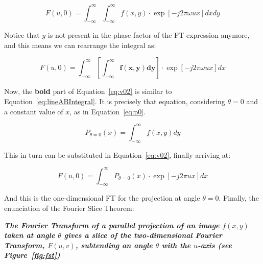 \begin{equation}
    \label{eq:v0}
    F(u, 0) = \int_{-\infty}^{\infty} \int_{-\infty}^{\infty} f(x, y)
    \cdot \exp \left[  -j 2\pi  \omega ux \right] dx dy
\end{equation}

Notice that $y$ is not present in the phase factor of the \gls{FT}
expression anymore, and this means we can rearrange the integral as:

\begin{equation}
    \label{eq:v02}
    F(u, 0) = \int_{-\infty}^{\infty} \left[ \mathbf{\int_{-\infty}^{\infty}
    f(x, y) dy }\right] \cdot \exp \left[  -j 2\pi  \omega ux \right] dx 
\end{equation}

Now, the \textbf{bold} part of Equation~\ref{eq:v02} is similar to
Equation~\ref{eq:lineABIntegral}. It is precisely that equation,
considering $\theta=0$ and a constant value of $x$, as in
Equation~\ref{eq:p0}.

\begin{equation}
    \label{eq:p0}
    P_{\theta=0} (x) = \int_{-\infty}^{\infty} f(x, y) dy
\end{equation}

This in turn can be substituted in Equation~\ref{eq:v02}, finally
arriving at:

\begin{equation}
    \label{eq:FTP}
    F(u, 0) = \int_{-\infty}^{\infty} P_{\theta=0} (x) \cdot \exp \left[
    -j 2\pi ux \right] dx
\end{equation}

And this is the one-dimensional \gls{FT} for the projection at angle
$\theta=0$. Finally, the enunciation of the Fourier Slice Theorem:
\begin{center}
    \begin{minipage}{0.8\textwidth}

        \noindent\textbf{\emph{The Fourier Transform of a parallel
                projection  of an image $f(x, y)$ taken at angle
                $\theta$ gives a slice of the two-dimensional Fourier
                Transform, $F(u, v)$, subtending an angle $\theta$ with
                the $u$-axis (see Figure~\ref{fig:fst})}}

    \end{minipage}
\end{center}


